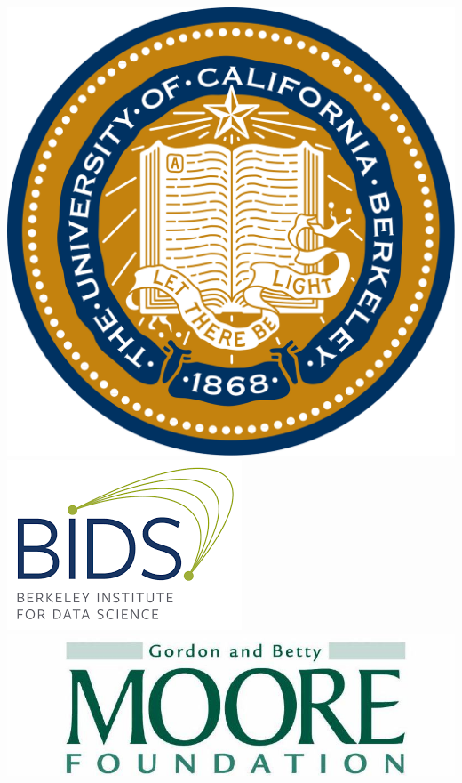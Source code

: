 \documentclass[11pt,xcolor=dvipsnames]{beamer}
\begin{document}
\begin{frame}
\begin{columns}
\begin{column}{0.08\linewidth}
\vspace{15pt}
\includegraphics[width=0.9\linewidth]{images/uc_berkeley.png} \\
\vspace{15pt}
\includegraphics[width=0.9\linewidth]{images/bids.png} \\
\vspace{15pt}
\includegraphics[width=0.9\linewidth]{images/moore_foundation.jpg} \\

\end{column}
\end{columns}
\end{frame}
\end{document}
